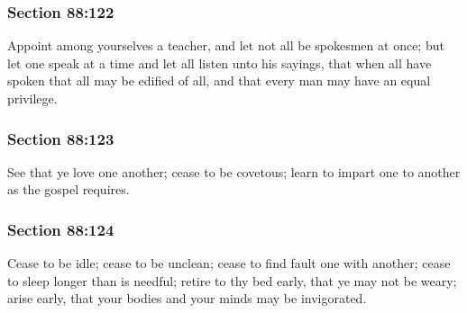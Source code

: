 	\subsubsection{Section 88:122} %
		\label{DC88-122}

		Appoint among yourselves a teacher, and let not all be spokesmen at once; but let one speak at a time and let all listen unto his sayings, that when all have spoken that all may be edified of all, and that every man may have an equal privilege.


	\subsubsection{Section 88:123} %
		\label{DC88-123}

		See that ye love one another; cease to be covetous; learn to impart one to another as the gospel requires.


	\subsubsection{Section 88:124} %
		\label{DC88-124}

		Cease to be idle; cease to be unclean; cease to find fault one with another; cease to sleep longer than is needful; retire to thy bed early, that ye may not be weary; arise early, that your bodies and your minds may be invigorated.



